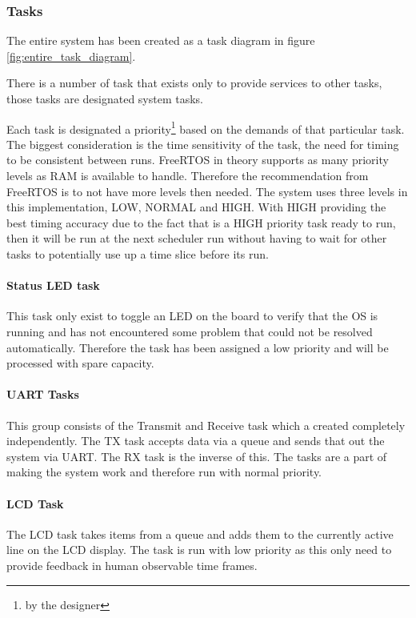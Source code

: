 \documentclass[../../../main]{subfiles}
\begin{document}
\subsubsection{Tasks}

The entire system has been created as a task diagram in figure \ref{fig:entire_task_diagram}. 

There is a number of task that exists only to provide services to other tasks, those tasks are designated system tasks. 

Each task is designated a priority\footnote{by the designer} based on the demands of that particular task. The biggest consideration is the time sensitivity of the task, the need for timing to be consistent between runs. FreeRTOS in theory supports as many priority levels as RAM is available to handle. Therefore the recommendation from FreeRTOS is to not have more levels then needed. The system uses three levels in this implementation, LOW, NORMAL and HIGH. With HIGH providing the best timing accuracy due to the fact that is a HIGH priority task  ready to run, then it will be run at the next scheduler run without having to wait for other tasks to potentially use up a time slice before its run.


\paragraph{Status LED task}

This task only exist to toggle an LED on the board to verify that the OS is running and has not encountered some problem that could not be resolved automatically. Therefore the task has been assigned a low priority and will be processed with spare capacity.

\paragraph{UART Tasks}%

This group consists of the Transmit and Receive task which a created completely independently. The TX task accepts data via a queue and sends that out the system via UART. The RX task is the inverse of this. The tasks are a part of making the system work and therefore run with normal priority. 


\paragraph{LCD Task}

The LCD task takes items from a queue and adds them to the currently active line on the LCD display. The task is run with low priority as this only need to provide feedback in human observable time frames.
\end{document}
